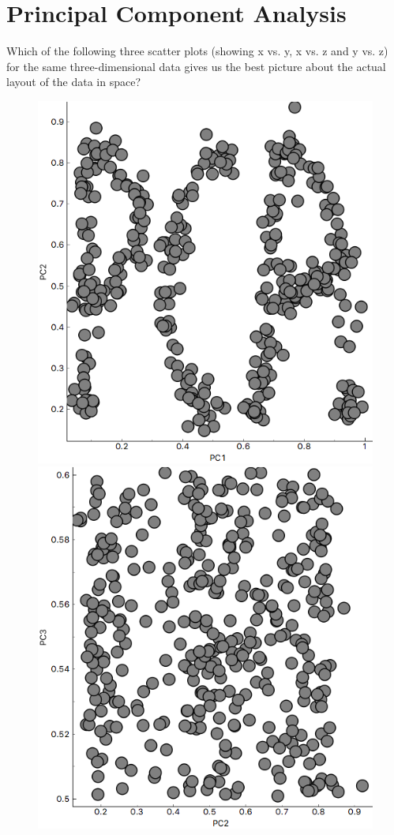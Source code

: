 \chapter{Principal Component Analysis}
\label{ch:pca}

Which of the following three scatter plots (showing x vs. y, x vs. z and y vs. z) for the same three-dimensional data gives us the best picture about the actual layout of the data in space?

\begin{figure}[h]
    \centering
    \includegraphics[scale=0.25]{pca1.png}
    \hspace{0.5cm}
    \includegraphics[scale=0.25]{pca2.png}

\end{figure}
